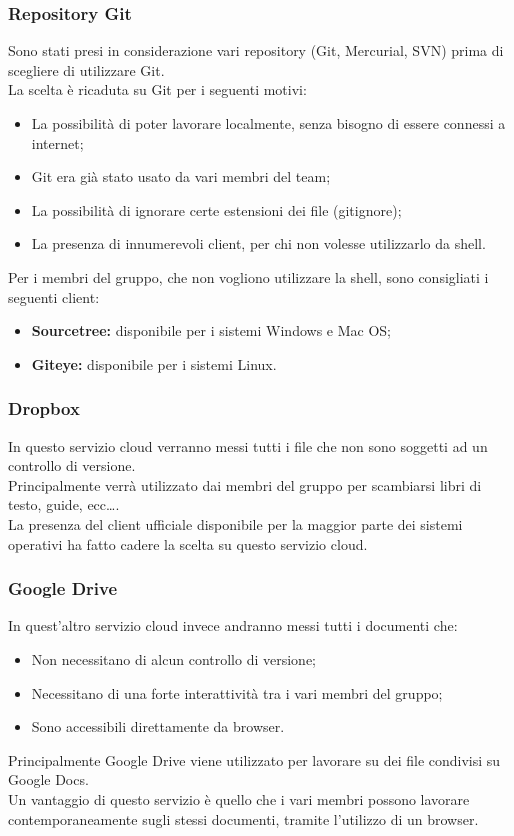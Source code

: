 \subsubsection{Repository Git}
\label{git}
Sono stati presi in considerazione vari repository\glossario{} (Git\glossario{}, Mercurial, SVN) prima di scegliere di utilizzare Git\glossario{}.
\\La scelta è ricaduta su Git\glossario{} per i seguenti motivi:
\begin{itemize}
\item La possibilità di poter lavorare localmente, senza bisogno di essere connessi a internet;
\item Git\glossario{} era già stato usato da vari membri del team;
\item La possibilità di ignorare certe estensioni dei file (gitignore);
\item La presenza di innumerevoli client, per chi non volesse utilizzarlo da shell.
\end{itemize}
Per i membri del gruppo, che non vogliono utilizzare la shell, sono consigliati i seguenti client:
\begin{itemize}
\item \textbf{Sourcetree:} disponibile per i sistemi Windows\glossario{} e Mac OS\glossario{};
\item \textbf{Giteye:} disponibile per  i sistemi Linux\glossario{}.
\end{itemize}

\subsubsection{Dropbox}
\label{dropbox}
In questo servizio cloud verranno messi tutti i file che non sono soggetti ad un controllo di versione.
\\Principalmente verrà utilizzato dai membri del gruppo per scambiarsi libri di testo, guide, ecc\dots .
\\La presenza del client ufficiale disponibile per la maggior parte dei sistemi operativi ha fatto cadere la scelta su questo servizio cloud.

\subsubsection{Google Drive}
\label{drive}
In quest'altro servizio cloud invece andranno messi tutti i documenti che:
\begin{itemize}
\item Non necessitano di alcun controllo di versione;
\item Necessitano di una forte interattività tra i vari membri del gruppo;
\item Sono accessibili direttamente da browser.
\end{itemize}
Principalmente Google Drive\glossario{} viene utilizzato per lavorare su dei file condivisi su Google Docs\glossario{}.
\\Un vantaggio di questo servizio è quello che i vari membri possono lavorare contemporaneamente sugli stessi documenti, tramite l'utilizzo di un browser.

